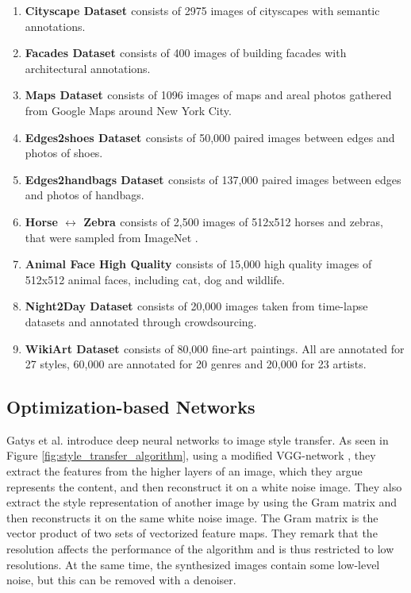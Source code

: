 \begin{enumerate}
	\item \textbf{Cityscape Dataset \cite{Cordts2016}} consists of 2975 images of cityscapes with semantic annotations.
	\item \textbf{Facades Dataset \cite{Tylecek2013}} consists of 400 images of building facades with architectural annotations.
	\item \textbf{Maps Dataset \cite{Isola2016}} consists of 1096 images of maps and areal photos gathered from Google Maps around New York City.
	\item \textbf{Edges2shoes Dataset \cite{Yu2014}} consists of 50,000 paired images between edges and photos of shoes.
	\item \textbf{Edges2handbags Dataset \cite{Zhu2016}} consists of 137,000 paired images between edges and photos of handbags.
	\item \textbf{Horse $\leftrightarrow$ Zebra \cite{Zhu2017b}} consists of 2,500 images of 512x512 horses and zebras, that were sampled from ImageNet \cite{Deng2009}.
	\item \textbf{Animal Face High Quality \cite{Choi2019}} consists of 15,000 high quality images of 512x512 animal faces, including cat, dog and wildlife.
	\item \textbf{Night2Day Dataset \cite{Laffont2014}} consists of 20,000 images taken from time-lapse datasets and annotated through crowdsourcing.
	\item \textbf{WikiArt Dataset \cite{Saleh2015}} consists of 80,000 fine-art paintings.
	All are annotated for 27 styles, 60,000 are annotated for 20 genres and 20,000 for 23 artists.
\end{enumerate}

\subsection{Optimization-based Networks}
Gatys et al. \cite{Gatys2016} introduce deep neural networks to image style transfer.
As seen in Figure \ref{fig:style_transfer_algorithm}, using a modified VGG-network \cite{Simonyan2015}, they extract the features from the higher layers of an image, which they argue represents the content, and then reconstruct it on a white noise image.
They also extract the style representation of another image by using the Gram matrix and then reconstructs it on the same white noise image.
The Gram matrix is the vector product of two sets of vectorized feature maps.
They remark that the resolution affects the performance of the algorithm and is thus restricted to low resolutions.
At the same time, the synthesized images contain some low-level noise, but this can be removed with a denoiser.

